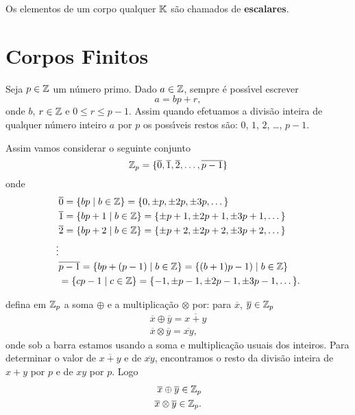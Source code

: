 \begin{observacao}
	Os elementos de um corpo qualquer $\mathbb{K}$ s\~ao chamados de \textbf{escalares}.
\end{observacao}

\section{Corpos Finitos}\label{sec:corpor_finitos}

Seja $p \in \mathbb{Z}$ um n\'umero primo. Dado $a \in \mathbb{Z}$, sempre \'e poss{\'\i}vel escrever
\[
a = bp + r,
\]
onde $b$, $r \in \mathbb{Z}$ e $0 \le r \le p - 1$. Assim quando efetuamos a divis\~ao inteira de qualquer n\'umero inteiro $a$ por $p$ os poss{\'\i}veis restos s\~ao: $0$, 
$1$, $2$, \dots, $p -1 $.

Assim vamos considerar o seguinte conjunto
\[
\mathbb{Z}_p = \{\overline{0}, \overline{1}, \overline{2}, \dots, \overline{p - 1}\}
\]
onde
\begin{align*}
	&\overline{0} = \{bp \mid b \in \mathbb{Z}\} = \{0, \pm p, \pm 2p, \pm 3p, \dots\}\\
	&\overline{1} = \{bp + 1\mid b \in \mathbb{Z}\} = \{\pm p + 1, \pm 2p + 1, \pm 3p + 1, \dots\}\\
	&\overline{2} = \{bp + 2\mid b \in \mathbb{Z}\} = \{\pm p + 2, \pm 2p + 2, \pm 3p + 2, \dots\}\\
	\vdots\\
	&\overline{p - 1} = \{bp + (p - 1) \mid b \in \mathbb{Z}\} = \{(b + 1)p - 1) \mid b \in \mathbb{Z}\}\\ &= \{cp - 1 \mid c \in \mathbb{Z}\} = \{-1, \pm p - 1, \pm 2p - 1, \pm 3p - 1, \dots\}.
\end{align*}

defina em $\mathbb{Z}_p$ a soma $\oplus$ e a multiplica\c{c}\~ao $\otimes$ por: para $\overline{x}$, $\overline{y} \in \mathbb{Z}_p$
\begin{align*}
	\overline{x} \oplus \overline{y} = \overline{x + y}\\
	\overline{x} \otimes \overline{y} = \overline{xy},
\end{align*}
onde sob a barra estamos usando a soma e multiplica\c{c}\~ao usuais dos inteiros. Para determinar o valor de $\overline{x + y}$ e de $\overline{xy}$, encontramos o resto da divis\~ao inteira de $x + y$ por $p$ e de $xy$ por $p$. Logo
\begin{align*}
	\overline{x} \oplus \overline{y} \in \mathbb{Z}_p\\
	\overline{x} \otimes \overline{y} \in \mathbb{Z}_p.
\end{align*}

